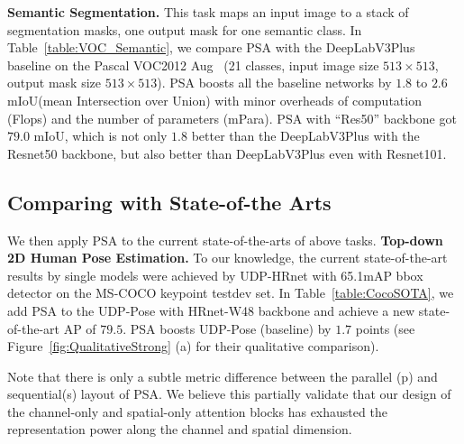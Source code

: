\documentclass[10pt,twocolumn,letterpaper]{article}
\begin{document}
\textbf{Semantic Segmentation.}  This task maps an input image to a stack of segmentation masks, one output mask for one semantic class. In Table~\ref{table:VOC_Semantic}, we compare PSA with the DeepLabV3Plus~\cite{Chen17} baseline on the Pascal VOC2012 Aug{~\cite{Everingham15}} (21 classes, input image size $513 \times 513$, output mask size $513 \times 513$). PSA boosts all the baseline networks by $1.8$ to $2.6$mIoU(mean Intersection over Union) with minor overheads of computation (Flops) and the number of parameters (mPara).  PSA with ``Res50'' backbone got $79.0$ mIoU, which is not only $1.8$ better than the DeepLabV3Plus with the Resnet50 backbone, but also better than DeepLabV3Plus even with Resnet101. 


\subsection{Comparing with State-of-the Arts}
We then apply PSA to the current state-of-the-arts of above tasks.
\textbf{Top-down 2D Human Pose Estimation.} To our knowledge, the current state-of-the-art results by single models were achieved by UDP-HRnet with 65.1mAP bbox detector on the MS-COCO keypoint testdev set. In Table~\ref{table:CocoSOTA}, we add PSA to the UDP-Pose with HRnet-W48 backbone and achieve a new state-of-the-art AP of $79.5$. PSA boosts UDP-Pose (baseline) by $1.7$ points (see Figure~\ref{fig:QualitativeStrong} (a) for their qualitative comparison). 

Note that there is only a subtle metric difference between the parallel (p) and sequential(s) layout of PSA. We believe this partially validate that our design of the channel-only and spatial-only attention blocks has exhausted the representation power along the channel and spatial dimension. 
\end{document}
